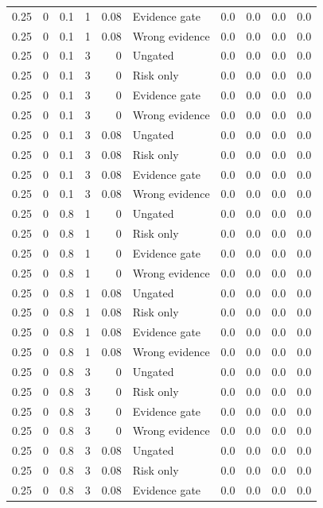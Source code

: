 \begin{longtable}{rrrrrlrrrr}
0.25 & 0 & 0.1 & 1 & 0.08 & Evidence gate & 0.0 & 0.0 & 0.0 & 0.0\\
0.25 & 0 & 0.1 & 1 & 0.08 & Wrong evidence & 0.0 & 0.0 & 0.0 & 0.0\\
0.25 & 0 & 0.1 & 3 & 0 & Ungated & 0.0 & 0.0 & 0.0 & 0.0\\
0.25 & 0 & 0.1 & 3 & 0 & Risk only & 0.0 & 0.0 & 0.0 & 0.0\\
0.25 & 0 & 0.1 & 3 & 0 & Evidence gate & 0.0 & 0.0 & 0.0 & 0.0\\
0.25 & 0 & 0.1 & 3 & 0 & Wrong evidence & 0.0 & 0.0 & 0.0 & 0.0\\
0.25 & 0 & 0.1 & 3 & 0.08 & Ungated & 0.0 & 0.0 & 0.0 & 0.0\\
0.25 & 0 & 0.1 & 3 & 0.08 & Risk only & 0.0 & 0.0 & 0.0 & 0.0\\
0.25 & 0 & 0.1 & 3 & 0.08 & Evidence gate & 0.0 & 0.0 & 0.0 & 0.0\\
0.25 & 0 & 0.1 & 3 & 0.08 & Wrong evidence & 0.0 & 0.0 & 0.0 & 0.0\\
0.25 & 0 & 0.8 & 1 & 0 & Ungated & 0.0 & 0.0 & 0.0 & 0.0\\
0.25 & 0 & 0.8 & 1 & 0 & Risk only & 0.0 & 0.0 & 0.0 & 0.0\\
0.25 & 0 & 0.8 & 1 & 0 & Evidence gate & 0.0 & 0.0 & 0.0 & 0.0\\
0.25 & 0 & 0.8 & 1 & 0 & Wrong evidence & 0.0 & 0.0 & 0.0 & 0.0\\
0.25 & 0 & 0.8 & 1 & 0.08 & Ungated & 0.0 & 0.0 & 0.0 & 0.0\\
0.25 & 0 & 0.8 & 1 & 0.08 & Risk only & 0.0 & 0.0 & 0.0 & 0.0\\
0.25 & 0 & 0.8 & 1 & 0.08 & Evidence gate & 0.0 & 0.0 & 0.0 & 0.0\\
0.25 & 0 & 0.8 & 1 & 0.08 & Wrong evidence & 0.0 & 0.0 & 0.0 & 0.0\\
0.25 & 0 & 0.8 & 3 & 0 & Ungated & 0.0 & 0.0 & 0.0 & 0.0\\
0.25 & 0 & 0.8 & 3 & 0 & Risk only & 0.0 & 0.0 & 0.0 & 0.0\\
0.25 & 0 & 0.8 & 3 & 0 & Evidence gate & 0.0 & 0.0 & 0.0 & 0.0\\
0.25 & 0 & 0.8 & 3 & 0 & Wrong evidence & 0.0 & 0.0 & 0.0 & 0.0\\
0.25 & 0 & 0.8 & 3 & 0.08 & Ungated & 0.0 & 0.0 & 0.0 & 0.0\\
0.25 & 0 & 0.8 & 3 & 0.08 & Risk only & 0.0 & 0.0 & 0.0 & 0.0\\
0.25 & 0 & 0.8 & 3 & 0.08 & Evidence gate & 0.0 & 0.0 & 0.0 & 0.0\\

\end{longtable}
